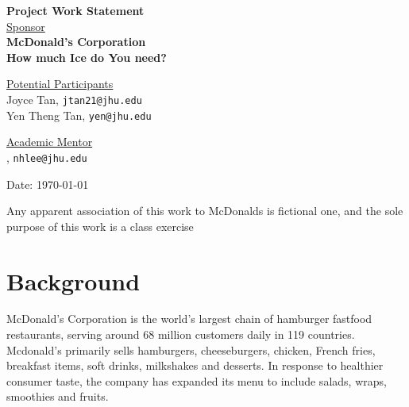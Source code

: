 \documentclass[12pt,letterpaper]{article}
\theoremstyle{definition}
\begin{document}
\def\shiftdowna{0.32in}  %
\def\shiftdownb{0.22in}  %


\begin{center}
\textbf{{\large Project Work Statement}}\\


\vspace \shiftdowna
\underline {Sponsor}\\ 
\vspace{5pt}
\textbf{{\large McDonald's Corporation}}\\


\vspace \shiftdowna
\textbf{{\large How much Ice do You need?}}

\vspace \shiftdownb
\underline {Potential Participants}\\
\vspace{5pt}
Joyce Tan, \texttt{jtan21@jhu.edu} \\
\vspace{2pt}
Yen Theng Tan, \texttt{yen@jhu.edu} \\
\vspace{2pt}

\vspace{0.35in}
\vspace \shiftdownb
\underline {Academic Mentor} \\
\vspace{5pt}
, \texttt{nhlee@jhu.edu}


Date: \today

\end{center}

\vfill  
\footnoterule
\noindent \small{Any apparent association of this work to McDonalds is
fictional one, and the sole purpose of this work is a class exercise}

\newpage

\section{Background} 
McDonald's Corporation is the world's largest chain of hamburger fastfood restaurants, serving around 68 million customers daily in 119 countries. Mcdonald's primarily sells hamburgers, cheeseburgers, chicken, French fries, breakfast items, soft drinks, milkshakes and desserts. In response to healthier consumer taste, the company has expanded its menu to include salads, wraps, smoothies and fruits.
\end{document}

